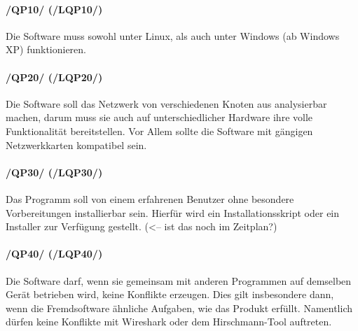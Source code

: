 \paragraph{/QP10/ (/LQP10/)} Die Software muss sowohl unter Linux, als auch
unter Windows (ab Windows XP) funktionieren.

\paragraph{/QP20/ (/LQP20/)} Die Software soll das Netzwerk von verschiedenen
Knoten aus analysierbar machen, darum muss sie auch auf unterschiedlicher Hardware ihre
volle Funktionalität bereitstellen. Vor Allem sollte die Software mit gängigen
Netzwerkkarten kompatibel sein.

\paragraph{/QP30/ (/LQP30/)} Das Programm soll von einem erfahrenen Benutzer
ohne besondere Vorbereitungen installierbar sein. Hierfür wird ein
Installationsskript oder ein Installer zur Verfügung gestellt. (<-- ist das
noch im Zeitplan?)

\paragraph{/QP40/ (/LQP40/)} Die Software darf, wenn sie gemeinsam mit anderen
Programmen auf demselben Gerät betrieben wird, keine Konflikte erzeugen. Dies gilt
insbesondere dann, wenn die Fremdsoftware ähnliche Aufgaben, wie das Produkt
erfüllt. Namentlich dürfen keine Konflikte mit Wireshark oder dem
Hirschmann-Tool auftreten.
